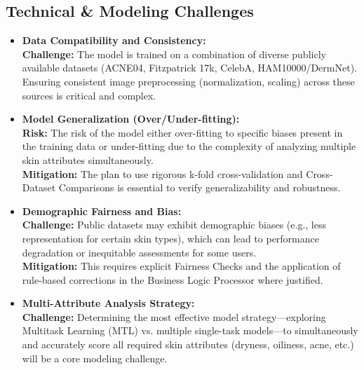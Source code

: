 \documentclass[12pt,a4paper]{article}
\begin{document}
\subsection{Technical \& Modeling Challenges}
\begin{itemize}
    \item \textbf{Data Compatibility and Consistency:}\\ \textbf{Challenge:} The model is trained on a combination of diverse publicly available datasets (ACNE04, Fitzpatrick 17k, CelebA, HAM10000/DermNet). Ensuring consistent image preprocessing (normalization, scaling) across these sources is critical and complex.
    \item \textbf{Model Generalization (Over/Under-fitting):}\\ \textbf{Risk:} The risk of the model either over-fitting to specific biases present in the training data or under-fitting due to the complexity of analyzing multiple skin attributes simultaneously. \\ \textbf{Mitigation:} The plan to use rigorous k-fold cross-validation and Cross-Dataset Comparisons is essential to verify generalizability and robustness.
    \item \textbf{Demographic Fairness and Bias:}\\ \textbf{Challenge:} Public datasets may exhibit demographic biases (e.g., less representation for certain skin types), which can lead to performance degradation or inequitable assessments for some users.\\ \textbf{Mitigation:} This requires explicit Fairness Checks and the application of rule-based corrections in the Business Logic Processor where justified.
    \item \textbf{Multi-Attribute Analysis Strategy:}\\ \textbf{Challenge:} Determining the most effective model strategy—exploring Multitask Learning (MTL) vs. multiple single-task models—to simultaneously and accurately score all required skin attributes (dryness, oiliness, acne, etc.) will be a core modeling challenge.
\end{itemize}
\end{document}

